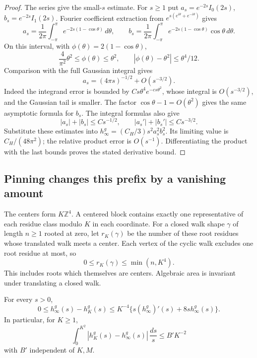 \begin{proof}
The series give the small-\(s\) estimate. For \(s\ge1\)
put \(a_s=e^{-2s}I_0(2s)\), \(b_s=e^{-2s}I_1(2s)\).
Fourier coefficient extraction from
\(e^{s(e^{i\theta}+e^{-i\theta})}\) gives
\[
 a_s=\frac1{2\pi}\int_{-\pi}^{\pi}
                   e^{-2s(1-\cos\theta)}\,d\theta,\qquad
 b_s=\frac1{2\pi}\int_{-\pi}^{\pi}
                   e^{-2s(1-\cos\theta)}\cos\theta\,d\theta.
\]
On this interval, with \(\phi(\theta)=2(1-\cos\theta)\),
\[
 \frac{4}{\pi^2}\theta^2\le\phi(\theta)\le\theta^2,\qquad
 |\phi(\theta)-\theta^2|\le\theta^4/12.
\]
Comparison with the full Gaussian integral gives
\[
 a_s=(4\pi s)^{-1/2}+O(s^{-3/2}).
\]
Indeed the integrand error is bounded by
\(Cs\theta^4e^{-c s\theta^2}\), whose integral is
\(O(s^{-3/2})\), and the Gaussian tail is smaller.
The factor \(\cos\theta-1=O(\theta^2)\) gives the
same asymptotic formula for \(b_s\).
The integral formulas also give
\[
 |a_s|+|b_s|\le Cs^{-1/2},\qquad
 |a_s'|+|b_s'|\le Cs^{-3/2}.
\]
Substitute these estimates into
\(h_\infty^g=(C_H/3)s^2a_s^2b_s^2\).
Its limiting value is \(C_H/(48\pi^2)\); the
relative product error is \(O(s^{-1})\).
Differentiating the product with the last bounds
proves the stated derivative bound.
\end{proof}

\subsection{Pinning changes this prefix by a vanishing amount}
\label{pgp-pinning-section}

The centers form \(K\mathbb Z^4\). A centered block
contains exactly one representative of each residue
class modulo \(K\) in each coordinate. For a closed
walk shape \(\gamma\) of length \(n\ge1\) rooted at zero,
let \(r_K(\gamma)\) be the number of these root residues
whose translated walk meets a center. Each vertex
of the cyclic walk excludes one root residue at most,
so
\begin{equation}
               0\le r_K(\gamma)\le\min(n,K^4).
 \label{pgp-root-count}
\end{equation}
This includes roots which themselves are centers.
Algebraic area is invariant under translating a closed
walk.

\begin{proposition}
\label{pgp-pinning}
For every \(s>0\),
\begin{equation}
 0\le h_\infty^g(s)-h_K^g(s)
 \le K^{-4}\{s(h_\infty^g)'(s)+8s h_\infty^g(s)\}.
 \label{pgp-pointwise-pinning}
\end{equation}
In particular, for \(K\ge1\),
\begin{equation}
 \int_0^{K^2}|h_K^g(s)-h_\infty^g(s)|\,\frac{ds}{s}
                                      \le B'K^{-2}
 \label{pgp-prefix-error}
\end{equation}
with \(B'\) independent of \(K,M\).
\end{proposition}

